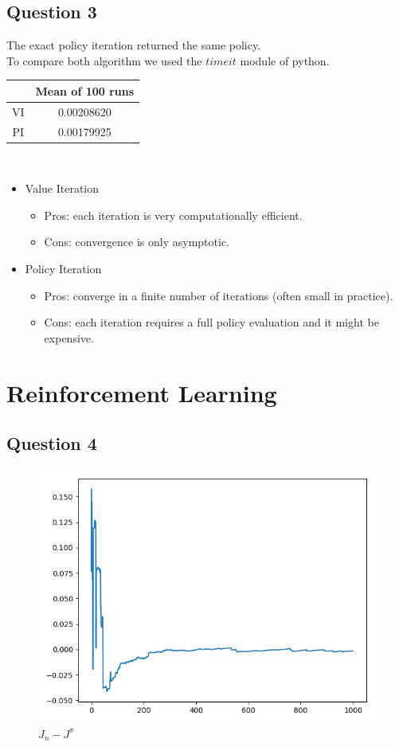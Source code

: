 \documentclass[10pt,a4paper]{article}
\begin{document}
\subsection{Question 3}
The exact policy iteration returned the same policy.\\
To compare both algorithm we used the $timeit$ module of python.\\
\begin{tabular}{|c|c|}
\hline 
 & Mean of 100 runs \\ 
\hline 
VI & 0.00208620 \\ 
\hline 
PI & 0.00179925 \\ 
\hline 
\end{tabular} \\
\begin{itemize}
\item Value Iteration
\begin{itemize}
\item Pros: each iteration is very computationally efficient.
\item Cons: convergence is only asymptotic.
\end{itemize}
\item Policy Iteration
\begin{itemize}
\item Pros: converge in a finite number of iterations (often small in
practice).
\item Cons: each iteration requires a full policy evaluation and it
might be expensive.
\end{itemize}
\end{itemize}
\newpage
\section{Reinforcement Learning}
\subsection{Question 4}
\begin{figure}[h]
\centering
\caption{$ J_n - J^{\pi} $}
\includegraphics[scale=.35]{q4.png}
\end{figure}
\end{document}
